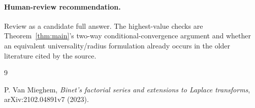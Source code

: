 \documentclass[11pt]{article}
\begin{document}
\paragraph{Human-review recommendation.}
Review as a candidate full answer.  The highest-value checks are
Theorem~\ref{thm:main}'s two-way conditional-convergence argument and whether
an equivalent universality/radius formulation already occurs in the older
literature cited by the source.

\begin{thebibliography}{9}
\raggedright P. Van Mieghem,
\emph{Binet's factorial series and extensions to Laplace transforms},
arXiv:2102.04891v7 (2023).\par
\end{thebibliography}
\end{document}
